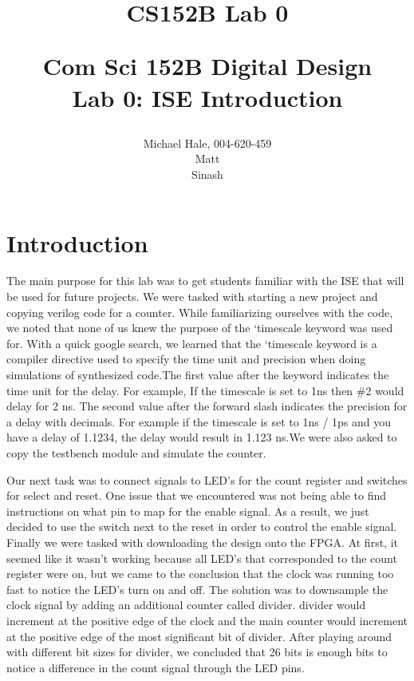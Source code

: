 \documentclass[11pt]{article}
\title{CS152B Lab 0}
\begin{document}
	
\title{\vspace{-0.5in} Com Sci 152B Digital Design \\
	Lab 0: ISE Introduction \\
	\author{Michael Hale, 004-620-459 \\ Matt \\ Sinash}}
\date{}
\maketitle

\section*{Introduction}
The main purpose for this lab was to get students familiar with the ISE that will be used for future projects. We were tasked with starting a new project and copying verilog code for a counter. While familiarizing ourselves with the code, we noted that none of us knew the purpose of the  ‘timescale keyword was used for. With a quick google search, we learned that the ‘timescale keyword is a compiler directive used to specify the time unit and precision when doing simulations of synthesized code.The first value after the keyword indicates the time unit for the delay. For example, If the timescale is set to 1ns then \#2 would delay for 2 ns. The second value after the forward slash indicates the precision for a delay with decimals. For example if the timescale is set to 1ns / 1ps and you have a delay of 1.1234, the delay would result in 1.123 ns.We were also asked to copy the testbench module and simulate the counter. 

Our next task was to connect signals to LED’s for the count register and switches for select and reset. One issue that we encountered was not being able to find instructions on what pin to map for the enable signal. As a result, we just decided to use the switch next to the reset in order to control the enable signal. Finally we were tasked with downloading the design onto the FPGA. At first, it seemed like it wasn’t working because all LED’s that corresponded to the count register were on, but we came to the conclusion that the clock was running too fast to notice the LED’s turn on and off. The solution was to downsample the clock signal by adding an additional counter called divider. divider would increment at the positive edge of the clock and the main counter would increment at the positive edge of the most significant bit of divider. After playing around with different bit sizes for divider, we concluded that 26 bits is enough bits to notice a difference in the count signal through the LED pins.
\end{document}

